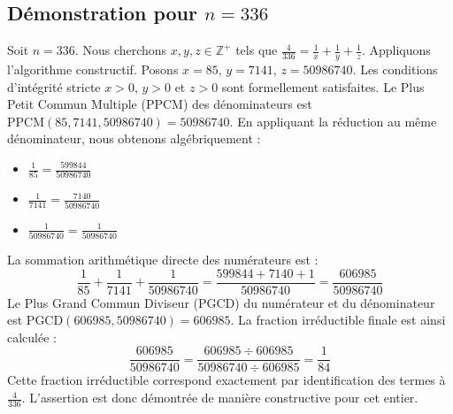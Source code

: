 \documentclass[11pt,a4paper]{article}
\begin{document}
\subsection{Démonstration pour $n = 336$}
Soit $n = 336$. Nous cherchons $x, y, z \in \mathbb{Z}^{+}$ tels que $\frac{4}{336} = \frac{1}{x} + \frac{1}{y} + \frac{1}{z}$.
Appliquons l'algorithme constructif. Posons $x = 85$, $y = 7141$, $z = 50986740$.
Les conditions d'intégrité stricte $x > 0$, $y > 0$ et $z > 0$ sont formellement satisfaites.
Le Plus Petit Commun Multiple (PPCM) des dénominateurs est $\text{PPCM}(85, 7141, 50986740) = 50986740$.
En appliquant la réduction au même dénominateur, nous obtenons algébriquement :
\begin{itemize}
    \item $\frac{1}{85} = \frac{599844}{50986740}$
    \item $\frac{1}{7141} = \frac{7140}{50986740}$
    \item $\frac{1}{50986740} = \frac{1}{50986740}$
\end{itemize}
La sommation arithmétique directe des numérateurs est :
$$ \frac{1}{85} + \frac{1}{7141} + \frac{1}{50986740} = \frac{599844 + 7140 + 1}{50986740} = \frac{606985}{50986740} $$
Le Plus Grand Commun Diviseur (PGCD) du numérateur et du dénominateur est $\text{PGCD}(606985, 50986740) = 606985$.
La fraction irréductible finale est ainsi calculée :
$$ \frac{606985}{50986740} = \frac{606985 \div 606985}{50986740 \div 606985} = \frac{1}{84} $$
Cette fraction irréductible correspond exactement par identification des termes à $\frac{4}{336}$. L'assertion est donc démontrée de manière constructive pour cet entier.
\end{document}
